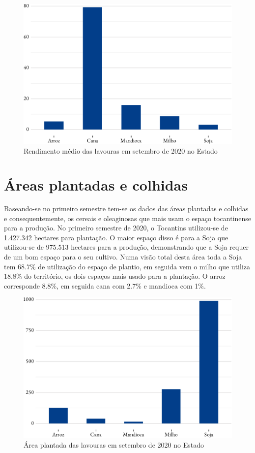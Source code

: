 \begin{figure}[h]
	\caption{Rendimento médio das lavouras em setembro de 2020 no Estado}
	\includegraphics{fig/rendim_medio-1.pdf}
\end{figure}

\section{Áreas plantadas e colhidas}

\par Baseando-se no primeiro semestre tem-se os dados das áreas plantadas e colhidas e consequentemente, os cereais e oleaginosas que mais usam o espaço tocantinense para a produção. No primeiro semestre de 2020, o Tocantins utilizou-se de 1.427.342 hectares para plantação. O maior espaço disso é para a Soja que utilizou-se de 975.513 hectares para a produção, demonstrando que a Soja requer de um bom espaço para o seu cultivo. Numa visão total desta área toda a Soja tem 68.7\% de utilização do espaço de plantio, em seguida vem o milho que utiliza 18.8\% do território, os dois espaços mais usado para a plantação. O arroz corresponde 8.8\%, em seguida cana com 2.7\% e mandioca com 1\%.

\begin{figure}[h]
	\caption{Área plantada das lavouras em setembro de 2020 no Estado}
	\includegraphics{fig/area_plantada-1.pdf}
\end{figure}

